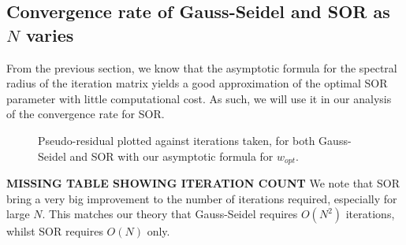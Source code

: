 \documentclass{article}
\numberwithin{equation}{section}
\theoremstyle{definition}
\begin{document}
\subsection{Convergence rate of Gauss-Seidel and SOR as $N$ varies}
From the previous section, we know that the asymptotic formula for the spectral radius of the iteration matrix yields a good approximation of the optimal SOR parameter with little computational cost. As such, we will use it in our analysis of the convergence rate for SOR.
\begin{figure}[H]
    \centering
    \hfill

    \hfill
    \caption{Pseudo-residual plotted against iterations taken, for both Gauss-Seidel and SOR with our asymptotic formula for $w_{opt}$.}
    \label{fig:fig5}
\end{figure}
\textbf{MISSING TABLE SHOWING ITERATION COUNT}
We note that SOR bring a very big improvement to the number of iterations required, especially for large $N$. This matches our theory that Gauss-Seidel requires $O(N^2)$ iterations, whilst SOR requires $O(N)$ only.
\end{document}
